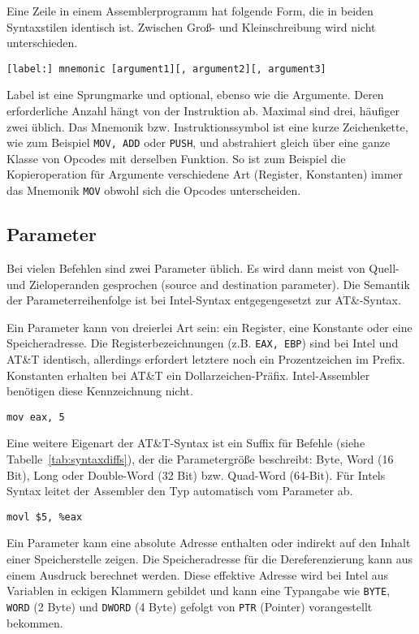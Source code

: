 Eine Zeile in einem Assemblerprogramm hat folgende Form, die in beiden
Syntaxstilen identisch ist. Zwischen Groß- und Kleinschreibung wird nicht unterschieden.

\texttt{[label:] mnemonic [argument1][, argument2][, argument3]}

Label ist eine Sprungmarke und optional, ebenso wie die Argumente. Deren
erforderliche Anzahl hängt von der Instruktion ab. Maximal sind drei, häufiger zwei
üblich. Das Mnemonik bzw. Instruktionssymbol ist eine kurze
Zeichenkette, wie zum Beispiel {\tt MOV, ADD} oder {\tt PUSH}, und abstrahiert gleich über eine ganze Klasse von Opcodes mit derselben Funktion.\cite{intelmanual} So ist zum
Beispiel die Kopieroperation für Argumente verschiedene Art (Register,
Konstanten) immer das Mnemonik {\tt MOV} obwohl sich die Opcodes unterscheiden.

\subsection{Parameter}

Bei vielen Befehlen sind zwei Parameter üblich. Es wird dann meist von Quell-
und Zieloperanden gesprochen (source and destination parameter). Die Semantik
der Parameterreihenfolge ist bei Intel-Syntax entgegengesetzt zur AT\&-Syntax.

Ein Parameter kann von dreierlei Art sein: ein Register, eine Konstante oder
eine Speicheradresse. Die Registerbezeichnungen (z.B. {\tt EAX, EBP}) sind bei Intel und
AT\&T identisch, allerdings erfordert letztere noch ein Prozentzeichen im
Prefix. Konstanten erhalten bei AT\&T ein Dollarzeichen-Präfix. Intel-Assembler
benötigen diese Kennzeichnung nicht.

\hspace{5mm} 
\texttt{mov eax, 5}

Eine weitere Eigenart der AT\&T-Syntax ist ein Suffix für Befehle (siehe
Tabelle~\ref{tab:syntaxdiffs}), der die Parametergröße beschreibt: Byte, Word
(16 Bit), Long oder Double-Word  (32 Bit) bzw.  Quad-Word (64-Bit). Für Intels
Syntax leitet der Assembler den Typ automatisch vom Parameter ab.

\hspace{5mm} 
\texttt{movl \$5, \%eax}

Ein Parameter kann eine absolute Adresse enthalten oder indirekt auf den Inhalt
einer Speicherstelle zeigen. Die Speicheradresse für die Dereferenzierung kann
aus einem Ausdruck berechnet werden.  Diese effektive Adresse wird bei Intel
aus Variablen in eckigen Klammern gebildet und kann eine Typangabe wie
\texttt{BYTE},  \texttt{WORD} (2 Byte) und \texttt{DWORD} (4 Byte) gefolgt von  \texttt{PTR}
(Pointer) vorangestellt bekommen.

